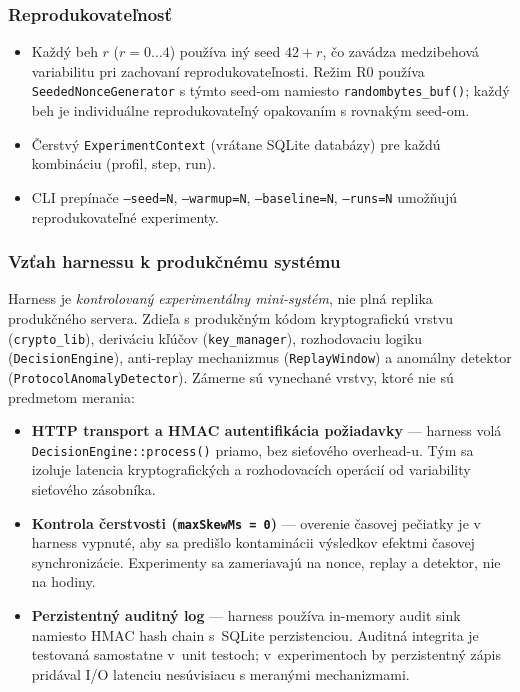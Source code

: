 \subsubsection{Reprodukovateľnosť}

\begin{itemize}[leftmargin=*,itemsep=2pt]
  \item Každý beh $r$ ($r = 0\ldots4$) používa iný seed $42 + r$, čo zavádza medzibehová variabilitu pri zachovaní reprodukovateľnosti. Režim R0 používa \texttt{SeededNonceGenerator} s týmto seed-om namiesto \texttt{randombytes\_buf()}; každý beh je individuálne reprodukovateľný opakovaním s rovnakým seed-om.
  \item Čerstvý \texttt{ExperimentContext} (vrátane SQLite databázy) pre každú kombináciu (profil, step, run).
  \item CLI prepínače \texttt{--seed=N}, \texttt{--warmup=N}, \texttt{--baseline=N}, \texttt{--runs=N} umožňujú reprodukovateľné experimenty.
\end{itemize}

\subsubsection{Vzťah harnessu k produkčnému systému}

Harness je \emph{kontrolovaný experimentálny mini-systém}, nie plná replika produkčného servera. Zdieľa s produkčným kódom kryptografickú vrstvu (\texttt{crypto\_lib}), deriváciu kľúčov (\texttt{key\_manager}), rozhodovaciu logiku (\texttt{DecisionEngine}), anti-replay mechanizmus (\texttt{ReplayWindow}) a anomálny detektor (\texttt{ProtocolAnomalyDetector}). Zámerne sú vynechané vrstvy, ktoré nie sú predmetom merania:

\begin{itemize}[leftmargin=*,itemsep=2pt]
  \item \textbf{HTTP transport a HMAC autentifikácia požiadavky} --- harness volá \texttt{DecisionEngine::process()} priamo, bez sieťového overhead-u. Tým sa izoluje latencia kryptografických a rozhodovacích operácií od variability sieťového zásobníka.
  \item \textbf{Kontrola čerstvosti (\texttt{maxSkewMs = 0})} --- overenie časovej pečiatky je v harness vypnuté, aby sa predišlo kontaminácii výsledkov efektmi časovej synchronizácie. Experimenty sa zameriavajú na nonce, replay a detektor, nie na hodiny.
  \item \textbf{Perzistentný auditný log} --- harness používa in-memory audit sink namiesto HMAC hash chain s~SQLite perzistenciou. Auditná integrita je testovaná samostatne v~unit testoch; v~experimentoch by perzistentný zápis pridával I/O latenciu nesúvisiacu s meranými mechanizmami.
\end{itemize}

